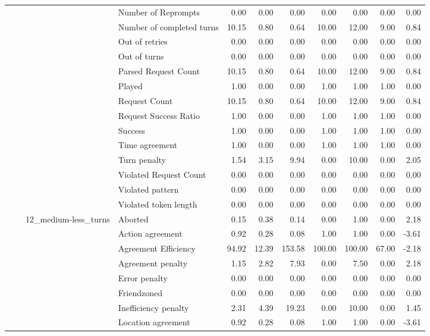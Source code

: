 \begin{tabular}{llllrrrrrrr}
 &  &  & Number of Reprompts & 0.00 & 0.00 & 0.00 & 0.00 & 0.00 & 0.00 & 0.00 \\
 &  &  & Number of completed turns & 10.15 & 0.80 & 0.64 & 10.00 & 12.00 & 9.00 & 0.84 \\
 &  &  & Out of retries & 0.00 & 0.00 & 0.00 & 0.00 & 0.00 & 0.00 & 0.00 \\
 &  &  & Out of turns & 0.00 & 0.00 & 0.00 & 0.00 & 0.00 & 0.00 & 0.00 \\
 &  &  & Parsed Request Count & 10.15 & 0.80 & 0.64 & 10.00 & 12.00 & 9.00 & 0.84 \\
 &  &  & Played & 1.00 & 0.00 & 0.00 & 1.00 & 1.00 & 1.00 & 0.00 \\
 &  &  & Request Count & 10.15 & 0.80 & 0.64 & 10.00 & 12.00 & 9.00 & 0.84 \\
 &  &  & Request Success Ratio & 1.00 & 0.00 & 0.00 & 1.00 & 1.00 & 1.00 & 0.00 \\
 &  &  & Success & 1.00 & 0.00 & 0.00 & 1.00 & 1.00 & 1.00 & 0.00 \\
 &  &  & Time agreement & 1.00 & 0.00 & 0.00 & 1.00 & 1.00 & 1.00 & 0.00 \\
 &  &  & Turn penalty & 1.54 & 3.15 & 9.94 & 0.00 & 10.00 & 0.00 & 2.05 \\
 &  &  & Violated Request Count & 0.00 & 0.00 & 0.00 & 0.00 & 0.00 & 0.00 & 0.00 \\
 &  &  & Violated pattern & 0.00 & 0.00 & 0.00 & 0.00 & 0.00 & 0.00 & 0.00 \\
 &  &  & Violated token length & 0.00 & 0.00 & 0.00 & 0.00 & 0.00 & 0.00 & 0.00 \\
\cline{3-11}
 &  & \multirow[t]{27}{*}{12_medium-less_turns} & Aborted & 0.15 & 0.38 & 0.14 & 0.00 & 1.00 & 0.00 & 2.18 \\
 &  &  & Action agreement & 0.92 & 0.28 & 0.08 & 1.00 & 1.00 & 0.00 & -3.61 \\
 &  &  & Agreement Efficiency & 94.92 & 12.39 & 153.58 & 100.00 & 100.00 & 67.00 & -2.18 \\
 &  &  & Agreement penalty & 1.15 & 2.82 & 7.93 & 0.00 & 7.50 & 0.00 & 2.18 \\
 &  &  & Error penalty & 0.00 & 0.00 & 0.00 & 0.00 & 0.00 & 0.00 & 0.00 \\
 &  &  & Friendzoned & 0.00 & 0.00 & 0.00 & 0.00 & 0.00 & 0.00 & 0.00 \\
 &  &  & Inefficiency penalty & 2.31 & 4.39 & 19.23 & 0.00 & 10.00 & 0.00 & 1.45 \\
 &  &  & Location agreement & 0.92 & 0.28 & 0.08 & 1.00 & 1.00 & 0.00 & -3.61 \\

\end{tabular}
